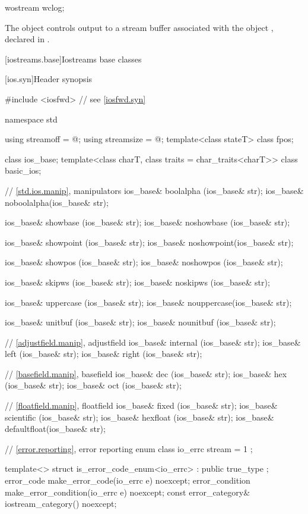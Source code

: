 %
\begin{itemdecl}
wostream wclog;
\end{itemdecl}

\begin{itemdescr}
\pnum
The object 
controls output to a stream buffer associated with the object ,
declared in .
\end{itemdescr}

[iostreams.base]{Iostreams base classes}

[ios.syn]{Header  synopsis}

%
%
\begin{codeblock}
#include <iosfwd>   // see \ref{iosfwd.syn}

namespace std {
  using streamoff  = @\impdef@;
  using streamsize = @\impdef@;
  template<class stateT> class fpos;

  class ios_base;
  template<class charT, class traits = char_traits<charT>>
    class basic_ios;

  // \ref{std.ios.manip}, manipulators
  ios_base& boolalpha  (ios_base& str);
  ios_base& noboolalpha(ios_base& str);

  ios_base& showbase   (ios_base& str);
  ios_base& noshowbase (ios_base& str);

  ios_base& showpoint  (ios_base& str);
  ios_base& noshowpoint(ios_base& str);

  ios_base& showpos    (ios_base& str);
  ios_base& noshowpos  (ios_base& str);

  ios_base& skipws     (ios_base& str);
  ios_base& noskipws   (ios_base& str);

  ios_base& uppercase  (ios_base& str);
  ios_base& nouppercase(ios_base& str);

  ios_base& unitbuf    (ios_base& str);
  ios_base& nounitbuf  (ios_base& str);

  // \ref{adjustfield.manip}, adjustfield
  ios_base& internal   (ios_base& str);
  ios_base& left       (ios_base& str);
  ios_base& right      (ios_base& str);

  // \ref{basefield.manip}, basefield
  ios_base& dec        (ios_base& str);
  ios_base& hex        (ios_base& str);
  ios_base& oct        (ios_base& str);

  // \ref{floatfield.manip}, floatfield
  ios_base& fixed      (ios_base& str);
  ios_base& scientific (ios_base& str);
  ios_base& hexfloat   (ios_base& str);
  ios_base& defaultfloat(ios_base& str);

  // \ref{error.reporting}, error reporting
  enum class io_errc {
    stream = 1
  };

  template<> struct is_error_code_enum<io_errc> : public true_type { };
  error_code make_error_code(io_errc e) noexcept;
  error_condition make_error_condition(io_errc e) noexcept;
  const error_category& iostream_category() noexcept;
}
\end{codeblock}
%
%
%
%
%

